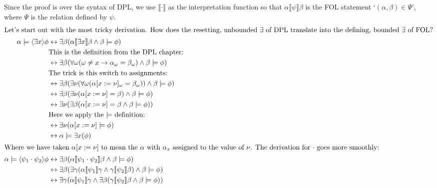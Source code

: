 \documentclass[12pt]{article}
\begin{document}
Since the proof is over the syntax of DPL, we use $\llbracket\cdot\rrbracket$ as the interpretation function so that $\alpha\llbracket\psi\rrbracket\beta$ is the FOL statement `$(\alpha,\beta)\in\Psi$', where $\Psi$ is the relation defined by $\psi$.
\begin{align}
%
\intertext{Let's start out with the most tricky derivation. How does the resetting, unbounded $\exists$ of DPL translate into the defining, bounded $\exists$ of FOL?}
%
\alpha\models\langle\exists x\rangle\phi
 & \leftrightarrow \exists\beta (\alpha\llbracket\exists x\rrbracket\beta \wedge \beta\models\phi) \nonumber\\
 & \text{This is the definition from the DPL chapter:}\nonumber\\
 & \leftrightarrow \exists\beta (\forall\omega (\omega \neq x \rightarrow \alpha_{\omega} = \beta_{\omega}) \wedge \beta\models\phi) \nonumber\\
 & \text{The trick is this switch to assignments:}\nonumber\\
 & \leftrightarrow \exists\beta (\exists\nu (\forall\omega (\alpha[x:=\nu]_{\omega} = \beta_{\omega})) \wedge \beta\models\phi) \nonumber\\
 & \leftrightarrow \exists\beta (\exists\nu (\alpha[x:=\nu] = \beta) \wedge \beta\models\phi) \nonumber\\
 & \leftrightarrow \exists\nu (\exists\beta (\alpha[x:=\nu] = \beta \wedge \beta\models\phi)) \nonumber\\
 & \text{Here we apply the $\models$ definition:}\nonumber\\
 & \leftrightarrow \exists\nu (\alpha[x:=\nu]\models\phi) \nonumber\\
 & \leftrightarrow \alpha\models\exists x (\phi) \\
%
\intertext{Where we have taken $\alpha[x:=\nu]$ to mean the $\alpha$ with $\alpha_x$ assigned to the value of $\nu$.
The derivation for $\cdot$ goes more smoothly:}
%
\alpha\models\langle\psi_1\cdot\psi_2\rangle\phi
 & \leftrightarrow \exists\beta (\alpha\llbracket\psi_1\cdot\psi_2\rrbracket\beta \wedge \beta\models\phi) \nonumber\\
 & \leftrightarrow \exists\beta(\exists\gamma (\alpha\llbracket\psi_1\rrbracket\gamma \wedge \gamma\llbracket\psi_2\rrbracket\beta) \wedge \beta\models\phi) \nonumber\\
 & \leftrightarrow \exists\gamma (\alpha\llbracket\psi_1\rrbracket\gamma \wedge \exists\beta(\gamma\llbracket\psi_2\rrbracket\beta \wedge \beta\models\phi)) \nonumber\\

\end{align}
\end{document}
